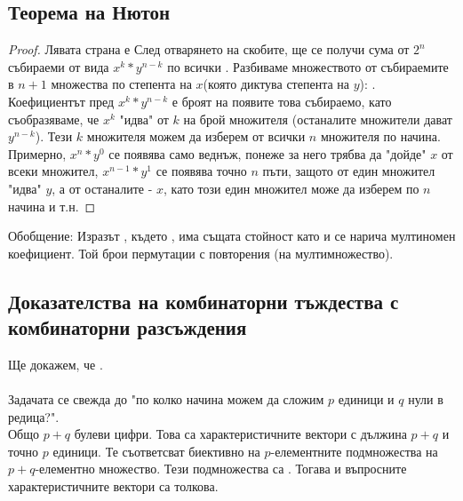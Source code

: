 \subsection{Теорема на Нютон}
\begin{theorem}
\end{theorem}
\begin{proof}
    Лявата страна е 
    След отварянето на скобите, ще се получи сума от \(2^n\) събираеми от вида \(x^k * y^{n - k}\) по 
    всички . Разбиваме множеството от събираемите в \(n + 1\) множества по 
    степента на \(x\)(която диктува степента на \(y\)): . 
    Коефициентът пред \(x^k * y^{n - k}\) е броят на появите това събираемо, като съобразяваме, че
    \(x^k\) "идва" от \(k\) на брой множителя (останалите множители дават \(y^{n - k}\)). Тези \(k\) 
    множителя можем да изберем от всички \(n\) множителя по  начина.
    Примерно, \(x^n * y^0\) се появява само веднъж, понеже за него трябва да "дойде" \(x\) от всеки 
    множител, \(x^{n- 1} * y^1\) се появява точно \(n\) пъти, защото от един множител "идва" \(y\), а от 
    останалите - \(x\), като този един множител може да изберем по \(n\) начина и т.н.
\end{proof}

Обобщение:
Изразът , където , има същата стойност като 
 и се нарича 
мултиномен коефициент. Той брои пермутации с повторения (на мултимножество).

\subsection{Доказателства на комбинаторни тъждества с комбинаторни разсъждения}
\begin{example}
    Ще докажем, че . \\
     \\
    Задачата се свежда до "по колко начина можем да сложим \(p\) единици и \(q\) нули в редица?". \\
    Общо \(p + q\) булеви цифри. Това са характеристичните вектори с дължина \(p + q\) и точно \(p\) единици.
    Те съответсват биективно на \(p\)-елементните подмножества на \(p + q\)-елементно множество. Тези 
    подмножества са . Тогава и въпросните характеристичните вектори са толкова.
\end{example}
